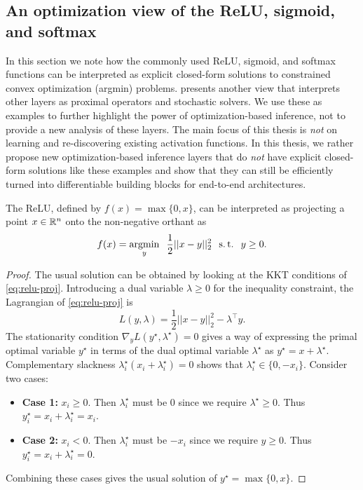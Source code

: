 \subsection{An optimization view of the ReLU, sigmoid, and softmax}
\label{sec:bg:existing}
In this section we note how the commonly used ReLU, sigmoid, and softmax
functions can be interpreted as explicit closed-form solutions
to constrained convex optimization (argmin) problems.
\citet{bibi2018deep} presents another view that interprets other
layers as proximal operators and stochastic solvers.
We use these as examples to further highlight the power of
optimization-based inference, not to provide a new analysis
of these layers. The main focus of this thesis is \emph{not}
on learning and re-discovering existing activation functions.
In this thesis, we rather propose new optimization-based inference
layers that do \emph{not} have explicit closed-form solutions
like these examples and show that they can still be efficiently
turned into differentiable building blocks for end-to-end architectures.

\begin{theorem}
  The ReLU, defined by $f(x) = \max\{0, x\}$,
  can be interpreted as projecting a point $x\in\mathbb{R}^n$ onto
  the non-negative orthant as
  \begin{equation}
    f(x) = \operatorname*{argmin}_y \;\; \frac{1}{2}||x-y||_2^2 \;\; \operatorname*{s.t.} \;\; y\geq 0.
    \label{eq:relu-proj}
  \end{equation}
\end{theorem}

\begin{proof}
  The usual solution can be obtained by looking at
  the KKT conditions of \cref{eq:relu-proj}.
  Introducing a dual variable $\lambda\geq 0$ for the inequality
  constraint, the Lagrangian of \cref{eq:relu-proj} is
  \begin{equation}
    L(y, \lambda)=\frac{1}{2}||x-y||_2^2 - \lambda^\top y.
  \end{equation}
  The stationarity condition
  $\nabla_y L(y^\star, \lambda^\star) = 0$
  gives a way of expressing the primal optimal
  variable $y^\star$ in terms of the dual optimal
  variable $\lambda^\star$ as $y^\star=x+\lambda^\star$.
  Complementary slackness $\lambda^\star_i(x_i+\lambda^\star_i)=0$
  shows that $\lambda^\star_i\in\{0, -x_i\}$.
  Consider two cases:
  \begin{itemize}
  \item \textbf{Case 1:} $x_i\geq 0$.
    Then $\lambda^\star_i$ must be 0
    since we require $\lambda^\star\geq 0$.
    Thus $y^\star_i=x_i+\lambda^\star_i=x_i$.
  \item \textbf{Case 2:} $x_i< 0$.
    Then $\lambda^\star_i$ must be $-x_i$
    since we require $y\geq 0$.
    Thus $y^\star_i=x_i+\lambda^\star_i=0$.
  \end{itemize}
  Combining these cases gives the usual solution of
  $y^\star=\max\{0, x\}$.
\end{proof}

